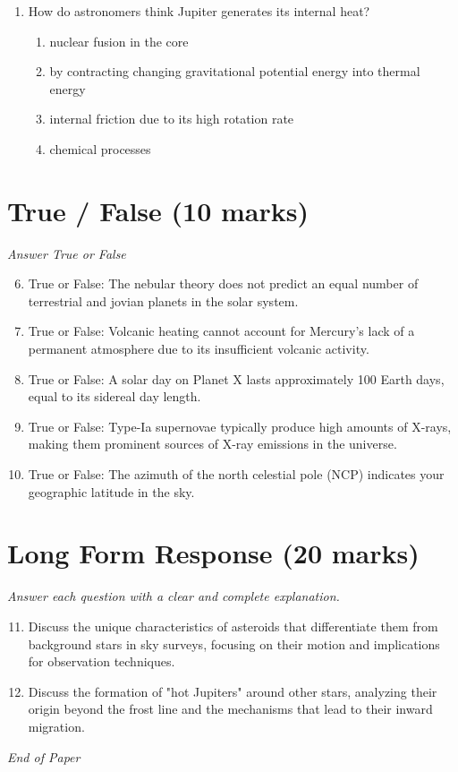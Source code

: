 \documentclass[12pt]{article}
\begin{document}
\begin{enumerate}[label=\arabic*.]
\begin{enumerate}[label=(\alph*)]
    \item it traps charged particles from Io's volcanoes in a "plasma torus" around the planet
    \item it causes spectacular auroral displays at Jupiter's north and south poles
    \item it switches polarity every 11 years
\end{enumerate}
\item How do astronomers think Jupiter generates its internal heat?
\begin{enumerate}[label=(\alph*)]
    \item nuclear fusion in the core
    \item by contracting changing gravitational potential energy into thermal energy
    \item internal friction due to its high rotation rate
    \item chemical processes
\end{enumerate}
\end{enumerate}

\section*{True / False (10 marks)}
\textit{Answer True or False}
\begin{enumerate}[label=\arabic*.]
\setcounter{enumi}{5}
\item True or False: The nebular theory does not predict an equal number of terrestrial and jovian planets in the solar system.
\item True or False: Volcanic heating cannot account for Mercury's lack of a permanent atmosphere due to its insufficient volcanic activity.
\item True or False: A solar day on Planet X lasts approximately 100 Earth days, equal to its sidereal day length.
\item True or False: Type-Ia supernovae typically produce high amounts of X-rays, making them prominent sources of X-ray emissions in the universe.
\item True or False: The azimuth of the north celestial pole (NCP) indicates your geographic latitude in the sky.
\end{enumerate}

\section*{Long Form Response (20 marks)}
\textit{Answer each question with a clear and complete explanation.}
\begin{enumerate}[label=\arabic*.]
\setcounter{enumi}{10}
\item Discuss the unique characteristics of asteroids that differentiate them from background stars in sky surveys, focusing on their motion and implications for observation techniques.
\item Discuss the formation of "hot Jupiters" around other stars, analyzing their origin beyond the frost line and the mechanisms that lead to their inward migration.
\end{enumerate}

\vfill
\noindent\textit{End of Paper}
\end{document}
